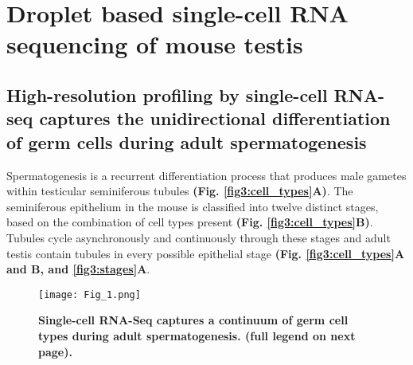 
\section{Droplet based single-cell RNA sequencing of mouse testis}
\subsection*{High-resolution profiling by single-cell RNA-seq captures the unidirectional differentiation of germ cells during adult spermatogenesis}

Spermatogenesis is a recurrent differentiation process that produces male gametes within testicular seminiferous tubules \textbf{(Fig. \ref{fig3:cell_types}A)}. The seminiferous epithelium in the mouse is classified into twelve distinct stages, based on the combination of cell types present \textbf{(Fig. \ref{fig3:cell_types}B)}. Tubules cycle asynchronously and continuously through these stages and adult testis contain tubules in every possible epithelial stage \textbf{(Fig. \ref{fig3:cell_types}A and B, and \ref{fig3:stages}A}. \\

\begin{figure}[!h]
\centering
\texttt{[image: Fig\_1.png]}
\caption[Droplet based scRNAseq of mouse spermatogenesis]{\textbf{Single-cell RNA-Seq captures a continuum of germ cell types during adult spermatogenesis. (full legend on next page).}\\}
\label{fig2:cell_types}
\end{figure}

\newpage

